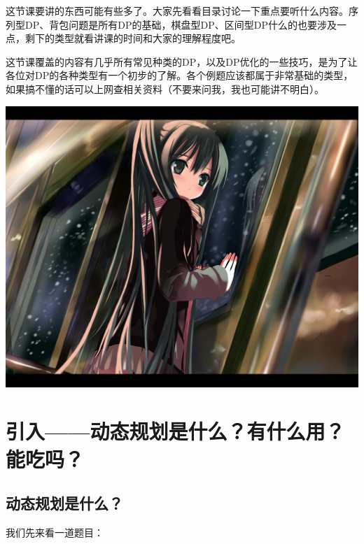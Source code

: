 \documentclass{article}
\theoremstyle{nonumberplain}
\begin{document}
这节课要讲的东西可能有些多了。大家先看看目录讨论一下重点要听什么内容。序列型DP、背包问题是所有DP的基础，棋盘型DP、区间型DP什么的也要涉及一点，剩下的类型就看讲课的时间和大家的理解程度吧。

这节课覆盖的内容有几乎所有常见种类的DP，以及DP优化的一些技巧，是为了让各位对DP的各种类型有一个初步的了解。各个例题应该都属于非常基础的类型，如果搞不懂的话可以上网查相关资料（不要来问我，我也可能讲不明白）。

\begin{center}\includegraphics[scale=0.5]{2583887_p0.jpg}\end{center}
\newpage

\section{引入------动态规划是什么？有什么用？能吃吗？}
\subsection{动态规划是什么？}
我们先来看一道题目：
\end{document}
